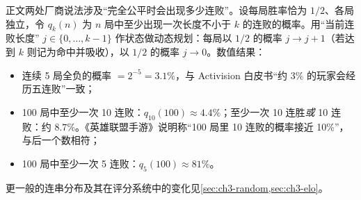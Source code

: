 正文两处厂商说法涉及“完全公平时会出现多少连败”。设每局胜率恰为 $1/2$、各局独立，令 $q_k(n)$ 为 $n$ 局中至少出现一次长度不小于 $k$ 的连败的概率。用“当前连败长度” $j\in\{0,\dots,k-1\}$ 作状态做动态规划：每局以 $1/2$ 的概率 $j\to j+1$（若达到 $k$ 则记为命中并吸收），以 $1/2$ 的概率 $j\to0$。数值结果\tagOwn：
\begin{itemize}
  \item 连续 5 局全负的概率 $=2^{-5}=3.1\%$，与 Activision 白皮书“约 3\% 的玩家会经历五连败”一致\cite{activision2024skill}；
  \item 100 局中至少一次 10 连败：$q_{10}(100)\approx4.4\%$；至少一次 10 连胜\emph{或} 10 连败：约 $8.7\%$。《英雄联盟手游》说明称“100 局里 10 连败的概率接近 10\%”\cite{riot2021wildrift}，与后一个数相符；
  \item 100 局中至少一次 5 连败：$q_5(100)\approx81\%$。
\end{itemize}
更一般的连串分布及其在评分系统中的变化见\cref{sec:ch3-random,sec:ch3-elo}。
